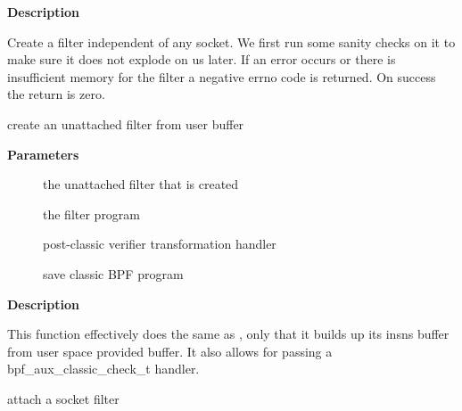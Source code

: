 \documentclass[a4paper,8pt,english]{sphinxmanual}
\begin{document}
\textbf{Description}

Create a filter independent of any socket. We first run some
sanity checks on it to make sure it does not explode on us later.
If an error occurs or there is insufficient memory for the filter
a negative errno code is returned. On success the return is zero.

\begin{fulllineitems}
\label{networking/kapi:c.bpf_prog_create_from_user}
create an unattached filter from user buffer

\end{fulllineitems}


\textbf{Parameters}
\begin{description}
\item[{}] \leavevmode
the unattached filter that is created

\item[{}] \leavevmode
the filter program

\item[{}] \leavevmode
post-classic verifier transformation handler

\item[{}] \leavevmode
save classic BPF program

\end{description}

\textbf{Description}

This function effectively does the same as {\hyperref[networking/kapi:c.bpf_prog_create]{\emph{}}}, only
that it builds up its insns buffer from user space provided buffer.
It also allows for passing a bpf\_aux\_classic\_check\_t handler.

\begin{fulllineitems}
\label{networking/kapi:c.sk_attach_filter}
attach a socket filter

\end{fulllineitems}
\end{document}

